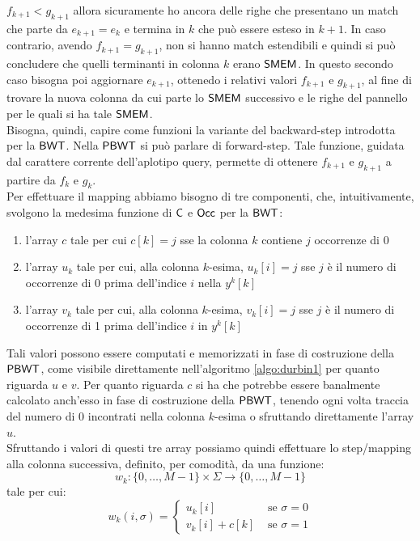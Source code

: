 $f_{k+1}<g_{k+1}$ allora sicuramente ho ancora delle righe che presentano un
match che parte da $e_{k+1}=e_{k}$ e termina in $k$ che può essere esteso in
$k+1$. In caso contrario, avendo $f_{k+1}=g_{k+1}$, non si hanno match
estendibili e quindi si può concludere che quelli terminanti in colonna $k$
erano $\mbox{\rm {\sf SMEM}}$. In questo secondo caso bisogna poi aggiornare $e_{k+1}$,
ottenedo i relativi valori $f_{k+1}$ e $g_{k+1}$, al fine di trovare la nuova
colonna da cui parte lo $\mbox{\rm {\sf SMEM}}$ successivo e le righe del pannello per le quali
si ha tale $\mbox{\rm {\sf SMEM}}$. \\
Bisogna, quindi, capire come funzioni la
variante del backward-step introdotta per la $\mbox{\rm {\sf BWT}}$. Nella $\mbox{\rm {\sf PBWT}}$ si può
parlare di forward-step. Tale funzione,
guidata dal carattere corrente dell'aplotipo query, permette di ottenere
$f_{k+1}$ e $g_{k+1}$ a partire da $f_k$ e $g_k$.\\ 
Per effettuare il mapping abbiamo bisogno di tre componenti, che,
intuitivamente, svolgono la medesima funzione di $\mbox{\rm {\sf C}}$ e $\mbox{\rm {\sf Occ}}$ per la
$\mbox{\rm {\sf BWT}}$: 
\begin{enumerate}
  \item l'array $c$ tale per cui $c[k]=j$ sse la colonna $k$ contiene $j$
  occorrenze di 0
  \item l'array $u_k$ tale per cui, alla colonna $k$-esima, $u_k[i]=j$ sse $j$ è
  il numero di occorrenze di 0 prima dell'indice $i$ nella $y^k[k]$ 
  \item l'array $v_k$ tale per cui, alla colonna $k$-esima, $v_k[i]=j$ sse $j$ è
  il numero di occorrenze di 1 prima dell'indice $i$ in $y^k[k]$ 
\end{enumerate}
Tali valori possono essere computati e memorizzati in fase di costruzione della
$\mbox{\rm {\sf PBWT}}$, come visibile direttamente nell'algoritmo \ref{algo:durbin1} per
quanto riguarda $u$ e $v$. Per quanto riguarda $c$
si ha che potrebbe essere banalmente calcolato anch'esso in fase di costruzione
della $\mbox{\rm {\sf PBWT}}$, tenendo ogni volta traccia del numero di 0 incontrati
nella colonna $k$-esima o sfruttando direttamente l'array $u$.\\
Sfruttando i valori di questi tre array possiamo quindi effettuare lo
step/mapping alla colonna successiva,
definito, per comodità, da una funzione:
\begin{equation}
  \label{eq:pbwtw1}
  w_k:\{0,\ldots,M-1\}\times\Sigma\to \{0,\ldots,M-1\}
\end{equation}
tale per cui:
\begin{equation}
  \label{eq:pbwtw2}
  w_k(i,\sigma)=
  \begin{cases}
    u_k[i]&\mbox{ se }\sigma=0\\
    v_k[i]+c[k]&\mbox{ se }\sigma=1
  \end{cases}
\end{equation}
